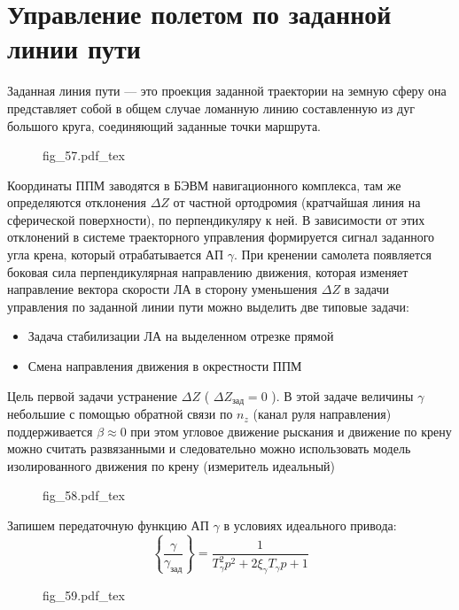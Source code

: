 \documentclass{article}
\newcommand{\incfig}[1]{
    {#1.pdf_tex}
}
\begin{document}
\section{Управление полетом по заданной линии пути}
Заданная линия пути --- это проекция заданной траектории на земную сферу она
представляет собой в общем случае ломанную линию составленную из дуг большого
круга, соединяющий заданные точки маршрута.

\begin{figure}[ht]
	\centering
	\incfig{fig_57}
	\label{fig:fig_57}
\end{figure}

Координаты ППМ заводятся в БЭВМ навигационного комплекса, там же определяются
отклонения $ \Delta Z$ от частной ортодромия (кратчайшая линия на сферической
поверхности), по перпендикуляру к ней. В зависимости от этих отклонений в
системе траекторного управления формируется сигнал заданного угла крена,
который отрабатывается АП $\gamma$. При кренении самолета появляется боковая
сила перпендикулярная направлению движения, которая изменяет направление вектора
скорости ЛА в сторону уменьшения $\Delta Z$
в задачи управления по заданной линии пути можно выделить две типовые задачи:
\begin{itemize}
	\item Задача стабилизации ЛА на выделенном отрезке прямой
	\item Смена направления движения в окрестности ППМ
\end{itemize}
Цель первой задачи устранение $ \Delta Z$ ( $\Delta Z_\text{зад} = 0$ ). В этой
задаче величины $\gamma$ небольшие с помощью обратной связи по $n_z$ (канал
руля направления) поддерживается $\beta \approx 0$ при этом угловое движение
рыскания и движение по крену можно считать развязанными и следовательно можно
использовать модель изолированного движения по крену (измеритель идеальный)

\begin{figure}[H]
	\centering
	\incfig{fig_58}
	\label{fig:fig_58}
\end{figure}

Запишем передаточную функцию АП $\gamma$ в условиях идеального привода:
\[
	\left\{ \frac{\gamma}{\gamma_\text{зад}} \right\}  = \frac{1}{ T_\gamma^2
		p^2 + 2 \xi_\gamma T_\gamma p + 1 }
\]

\begin{figure}[H]
	\centering
	\incfig{fig_59}
	\label{fig:fig_59}
\end{figure}
\end{document}
